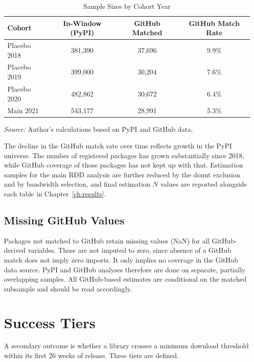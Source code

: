 \documentclass[12pt, a4paper]{report}
\begin{document}
\begin{table}[ht]
\centering
\caption{Sample Sizes by Cohort Year}\label{tab:sample-sizes}
\small
\begin{tabular}{lccc}
\toprule
\textbf{Cohort} & \textbf{In-Window (PyPI)} & \textbf{GitHub Matched} & \textbf{GitHub Match Rate} \\ \midrule
Placebo 2018 & 381,390 & 37,696 & 9.9\% \\
Placebo 2019 & 399,000 & 30,204 & 7.6\% \\
Placebo 2020 & 482,862 & 30,672 & 6.4\% \\
Main 2021    & 543,177 & 28,991 & 5.3\% \\ \bottomrule
\end{tabular}
\par\smallskip\noindent\textit{Source:} Author's calculations based on PyPI and GitHub data.
\end{table}

The decline in the GitHub match rate over time reflects growth in the PyPI universe. The number of registered packages has grown substantially since 2018, while GitHub coverage of those packages has not kept up with that. Estimation samples for the main RDD analysis are further reduced by the donut exclusion and by bandwidth selection, and final estimation $N$ values are reported alongside each table in Chapter~\ref{ch:results}.

\subsection{Missing GitHub Values}
Packages not matched to GitHub retain missing values (NaN) for all GitHub-derived variables. These are not imputed to zero, since absence of a GitHub match does not imply zero imports. It only implies no coverage in the GitHub data source. PyPI and GitHub analyses therefore are done on separate, partially overlapping samples. All GitHub-based estimates are conditional on the matched subsample and should be read accordingly.

\section{Success Tiers}\label{sec:data-tiers}
A secondary outcome is whether a library crosses a minimum download threshold within its first 26 weeks of release. Three tiers are defined.
\end{document}
